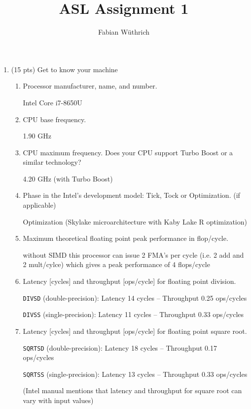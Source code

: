 \documentclass[a4paper]{article}
\title{ASL Assignment 1}
\author{Fabian Wüthrich}
\begin{document}
\maketitle

\begin{enumerate}
    \item (15 pts) Get to know your machine
    \begin{enumerate}
        \item Processor manufacturer, name, and number. \par
        Intel Core i7-8650U
        \item CPU base frequency. \par
        1.90 GHz \cite{intel-product-spec}
        \item CPU maximum frequency.  Does your CPU support Turbo Boost or a similar technology? \par
        4.20 GHz (with Turbo Boost) \cite{intel-product-spec}
        \item Phase in the Intel’s development model:  Tick, Tock or Optimization.  (if applicable) \par
        Optimization (Skylake microarchitecture with Kaby Lake R optimization) \cite{tick-tock}
        \item Maximum theoretical floating point peak performance in flop/cycle. \par
        without SIMD this processor can issue 2 FMA's per cycle (i.e. 2 add and 2 mult/cylce) which gives a peak performance of 4 flops/cycle \cite{intel-opt}

        \item Latency [cycles] and throughput [ops/cycle] for floating point division. \par
        \verb$DIVSD$ (double-precision): Latency 14 cycles -- Throughput 0.25 ops/cycles \par
        \verb$DIVSS$ (single-precision): Latency 11 cycles -- Throughput 0.33 ops/cycles 
        
        \item Latency [cycles] and throughput [ops/cycle] for floating point square root. \par
        \verb$SQRTSD$ (double-precision): Latency 18 cycles -- Throughput 0.17 ops/cycles \par
        \verb$SQRTSS$ (single-precision): Latency 13 cycles -- Throughput 0.33 ops/cycles \par
        {\small (Intel manual mentions that latency and throughput for square root can vary with input values)}
        

\end{enumerate}
\end{enumerate}
\end{document}
